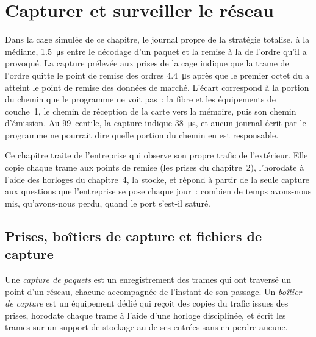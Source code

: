 \chapter{Capturer et surveiller le réseau}\label{ch:nw:capturing-and-monitoring-the-network}

Dans la cage simulée de ce chapitre, le journal propre de la stratégie totalise, à la médiane, \qty{1.5}{\micro\second} entre le décodage
d'un paquet et la remise à la  de l'ordre qu'il a provoqué. La capture prélevée aux prises de la cage indique que la trame
de l'ordre quitte le point de remise des ordres \qty{4.4}{\micro\second} après que le premier octet du  a atteint le
point de remise des données de marché. L'écart correspond à la portion du chemin que le programme ne voit pas~: la fibre et les
équipements de couche~1, le chemin de réception de la carte vers la mémoire, puis son chemin d'émission. Au 99~centile, la capture indique \qty{38}{\micro\second}, et aucun journal écrit par le programme ne pourrait
dire quelle portion du chemin en est responsable.

Ce chapitre traite de l'entreprise qui observe son propre trafic de l'extérieur. Elle copie chaque trame aux points de remise (les
prises du chapitre~2), l'horodate à l'aide des horloges du chapitre~4, la stocke, et répond à partir de la seule capture aux questions que l'entreprise se pose chaque
jour~: combien de temps avons-nous mis, qu'avons-nous perdu, quand le port s'est-il saturé.

\section{Prises, boîtiers de capture et fichiers de capture}

\begin{definition}\label{def:nw:capturing-and-monitoring-the-network:capture}
Une \emph{capture de paquets} est un enregistrement des trames qui ont traversé un point d'un réseau, chacune accompagnée
de l'instant de son passage. Un \emph{boîtier de capture} est un équipement dédié qui reçoit des copies du trafic issues des prises,
horodate chaque trame à l'aide d'une horloge disciplinée, et écrit les trames sur un support de stockage au  de ses entrées sans
en perdre aucune.
\end{definition}

